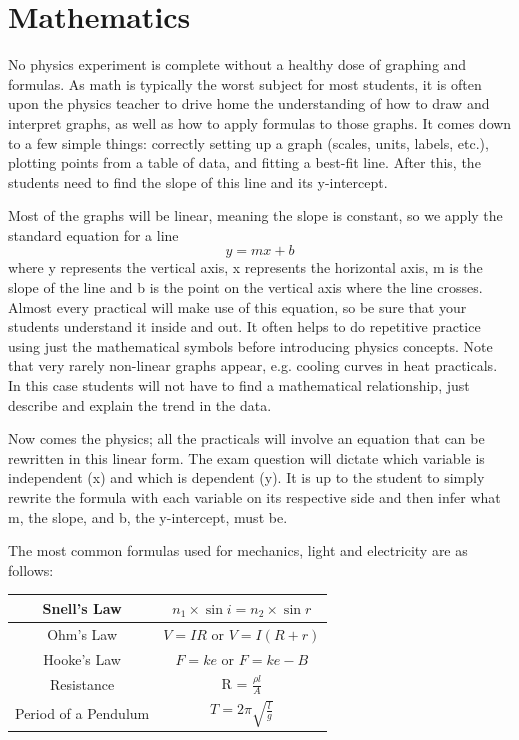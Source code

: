 \section{Mathematics}

No physics experiment is complete without a healthy dose of graphing and
formulas. As math is typically the worst subject for most students, it is often upon the
physics teacher to drive home the understanding of how to draw and interpret graphs, as
well as how to apply formulas to those graphs. It comes down to a few simple things:
correctly setting up a graph (scales, units, labels, etc.), plotting points from a table of
data, and fitting a best-fit line. After this, the students need to find the slope of this line
and its y-intercept.

Most of the graphs will be linear, meaning the slope is constant, so we apply the standard
equation for a line
$$y=mx + b$$
where y represents the vertical axis, x represents the horizontal axis, m is the slope of the line and b is the point on the vertical axis where the line crosses. Almost every practical will make use of this equation, so be sure that your students understand it inside and out. It often helps to do repetitive practice using just the mathematical symbols before introducing physics concepts. Note that very rarely non-linear graphs appear, e.g. cooling curves in heat practicals. In this case students will not have to find a mathematical relationship, just describe and explain the trend in the data.

Now comes the physics; all the practicals will involve an equation that can be
rewritten in this linear form. The exam question will dictate which variable is
independent (x) and which is dependent (y). It is up to the student to simply rewrite the
formula with each variable on its respective side and then infer what m, the slope, and b,
the y-intercept, must be.

The most common formulas used for mechanics, light and electricity are as follows:

\begin{center}
\begin{tabular}{ | c | c | }
\hline
Snell's Law & $n_1 \times \sin{i} = n_2 \times \sin{r}$ \\ \hline
Ohm's Law & $V=IR$ or $V = I(R + r)$\\ \hline
Hooke's Law & $ F = ke $ or $ F = ke - B $ \\ \hline
Resistance & R = $\frac{\rho l}{A}$ \\ \hline
Period of a Pendulum & $T = 2\pi\sqrt{\frac{l}{g}}$ \\ \hline
\end{tabular}
\end{center}

